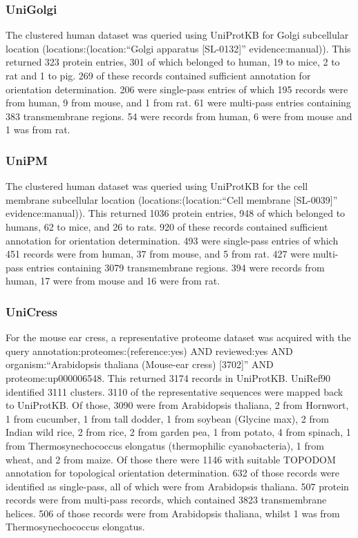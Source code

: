 \subsubsection{UniGolgi}
The clustered human dataset was queried using UniProtKB for Golgi subcellular location (locations:(location:``Golgi apparatus [SL-0132]'' evidence:manual)).
This returned 323 protein entries, 301 of which belonged to human, 19 to mice, 2 to rat and 1 to pig.
269 of these records contained sufficient annotation for orientation determination.
206 were single-pass entries of which 195 records were from human, 9 from mouse, and 1 from rat.
61 were multi-pass entries containing 383 transmembrane regions.
54 were records from human, 6 were from mouse and 1 was from rat.

\subsubsection{UniPM}
The clustered human dataset was queried using UniProtKB for the cell membrane subcellular location (locations:(location:``Cell membrane [SL-0039]'' evidence:manual)).
This returned 1036 protein entries, 948 of which belonged to humans, 62 to mice, and 26 to rats.
920 of these records contained sufficient annotation for orientation determination.
493 were single-pass entries of which 451 records were from human, 37 from mouse, and 5 from rat.
427 were multi-pass entries containing 3079 transmembrane regions.
394 were records from human, 17 were from mouse and 16 were from rat.

\subsubsection{UniCress}
For the mouse ear cress, a representative proteome dataset was acquired with the query annotation:proteomes:(reference:yes) AND reviewed:yes AND organism:``Arabidopsis thaliana (Mouse-ear cress) [3702]'' AND proteome:up000006548.
This returned 3174 records in UniProtKB.
UniRef90 identified 3111 clusters.
3110 of the representative sequences were mapped back to UniProtKB.
Of those, 3090 were from Arabidopsis thaliana, 2 from Hornwort, 1 from cucumber, 1 from tall dodder, 1 from soybean (Glycine max), 2 from Indian wild rice, 2 from rice, 2 from garden pea, 1 from potato, 4 from spinach, 1 from Thermosynechococcus elongatus (thermophilic cyanobacteria), 1 from wheat, and 2 from maize.
Of those there were 1146 with suitable TOPO\textunderscore DOM annotation for topological orientation determination.
632 of those records were identified as single-pass, all of which were from Arabidopsis thaliana.
507 protein records were from multi-pass records, which contained 3823 transmembrane helices.
506 of those records were from Arabidopsis thaliana, whilst 1 was from Thermosynechococcus elongatus.

